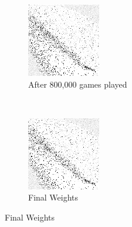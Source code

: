 \begin{figure}
	\begin{subfigure}[b]{0.4\textwidth}
	\includegraphics[width=\linewidth]{images/findings/round1/flipbook_e.png}
	\caption{After 800,000 games played}
	\end{subfigure}
	~
	\begin{subfigure}[b]{0.4\textwidth}
	\includegraphics[width=\linewidth]{images/findings/round1/flipbook_f.png}
	\caption{Final Weights}
	\end{subfigure}


\end{figure}
